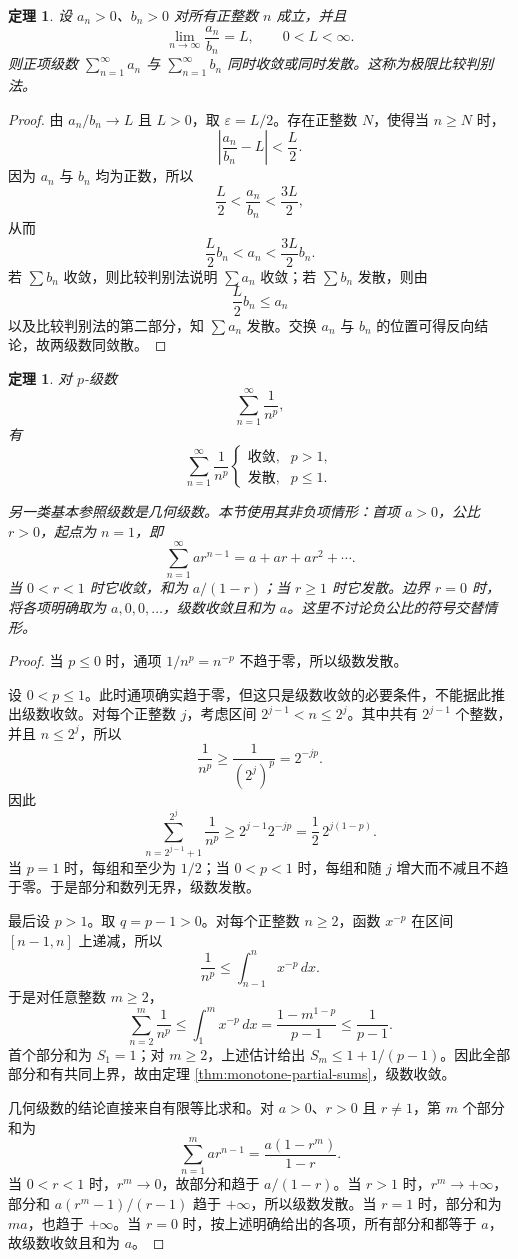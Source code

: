 \documentclass[UTF8,fontset=fandol,11pt]{ctexart}
\newtheorem{theorem}[definition]{定理}
\begin{document}
\begin{theorem}
设 $a_n>0$、$b_n>0$ 对所有正整数 $n$ 成立，并且
\[
\lim_{n\to\infty}\frac{a_n}{b_n}=L,
\qquad 0<L<\infty.
\]
则正项级数 $\sum_{n=1}^{\infty}a_n$ 与 $\sum_{n=1}^{\infty}b_n$ 同时收敛或同时发散。这称为极限比较判别法。\label{thm:limit-comparison}
\end{theorem}
\begin{proof}
由 $a_n/b_n\to L$ 且 $L>0$，取 $\varepsilon=L/2$。存在正整数 $N$，使得当 $n\geq N$ 时，
\[
\left|\frac{a_n}{b_n}-L\right|<\frac{L}{2}.
\]
因为 $a_n$ 与 $b_n$ 均为正数，所以
\[
\frac{L}{2}<\frac{a_n}{b_n}<\frac{3L}{2},
\]
从而
\[
\frac{L}{2}b_n<a_n<\frac{3L}{2}b_n.
\]
若 $\sum b_n$ 收敛，则比较判别法说明 $\sum a_n$ 收敛；若 $\sum b_n$ 发散，则由
\[
\frac{L}{2}b_n\leq a_n
\]
以及比较判别法的第二部分，知 $\sum a_n$ 发散。交换 $a_n$ 与 $b_n$ 的位置可得反向结论，故两级数同敛散。
\end{proof}
\begin{theorem}
对 $p$-级数
\[
\sum_{n=1}^{\infty}\frac{1}{n^p},
\]
有
\[
\sum_{n=1}^{\infty}\frac{1}{n^p}
\begin{cases}
\text{收敛},&p>1,\\
\text{发散},&p\leq1.
\end{cases}
\]
\label{thm:p-series}

另一类基本参照级数是几何级数。本节使用其非负项情形：首项 $a>0$，公比 $r>0$，起点为 $n=1$，即
\[
\sum_{n=1}^{\infty}ar^{n-1}=a+ar+ar^2+\cdots.
\]
当 $0<r<1$ 时它收敛，和为 $a/(1-r)$；当 $r\geq1$ 时它发散。边界 $r=0$ 时，将各项明确取为 $a,0,0,\ldots$，级数收敛且和为 $a$。这里不讨论负公比的符号交替情形。
\end{theorem}
\begin{proof}
当 $p\leq0$ 时，通项 $1/n^p=n^{-p}$ 不趋于零，所以级数发散。

设 $0<p\leq1$。此时通项确实趋于零，但这只是级数收敛的必要条件，不能据此推出级数收敛。对每个正整数 $j$，考虑区间 $2^{j-1}<n\leq2^j$。其中共有 $2^{j-1}$ 个整数，并且 $n\leq2^j$，所以
\[
\frac{1}{n^p}\geq\frac{1}{(2^j)^p}=2^{-jp}.
\]
因此
\[
\sum_{n=2^{j-1}+1}^{2^j}\frac{1}{n^p}
\geq 2^{j-1}2^{-jp}=\frac12\,2^{j(1-p)}.
\]
当 $p=1$ 时，每组和至少为 $1/2$；当 $0<p<1$ 时，每组和随 $j$ 增大而不减且不趋于零。于是部分和数列无界，级数发散。

最后设 $p>1$。取 $q=p-1>0$。对每个正整数 $n\geq2$，函数 $x^{-p}$ 在区间 $[n-1,n]$ 上递减，所以
\[
\frac{1}{n^p}\leq\int_{n-1}^{n}x^{-p}\,dx.
\]
于是对任意整数 $m\geq2$，
\[
\sum_{n=2}^{m}\frac{1}{n^p}
\leq\int_{1}^{m}x^{-p}\,dx
=\frac{1-m^{1-p}}{p-1}
\leq\frac{1}{p-1}.
\]
首个部分和为 $S_1=1$；对 $m\geq2$，上述估计给出 $S_m\leq1+1/(p-1)$。因此全部部分和有共同上界，故由定理 \ref{thm:monotone-partial-sums}，级数收敛。

几何级数的结论直接来自有限等比求和。对 $a>0$、$r>0$ 且 $r\ne1$，第 $m$ 个部分和为
\[
\sum_{n=1}^{m}ar^{n-1}=\frac{a(1-r^m)}{1-r}.
\]
当 $0<r<1$ 时，$r^m\to0$，故部分和趋于 $a/(1-r)$。当 $r>1$ 时，$r^m\to+\infty$，部分和 $a(r^m-1)/(r-1)$ 趋于 $+\infty$，所以级数发散。当 $r=1$ 时，部分和为 $ma$，也趋于 $+\infty$。当 $r=0$ 时，按上述明确给出的各项，所有部分和都等于 $a$，故级数收敛且和为 $a$。
\end{proof}
\end{document}
